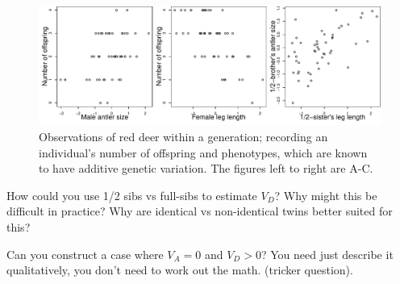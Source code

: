 \begin{figure}
\begin{center}
\includegraphics[width=\textwidth]{figures/Red_deer_selection.pdf}
\end{center}
\caption{ Observations of red deer within a generation; recording an
individual’s number of offspring and phenotypes, which are known to
have additive genetic variation. The figures left to right are A-C.} \label{fig:red_deer_Q}
\end{figure}



\begin{question}
How could you use 1/2 sibs vs full-sibs to estimate $V_D$? Why might
this be difficult in practice? Why are identical vs non-identical
twins better suited for this?
\end{question}

\begin{question}
Can you construct a case where $V_A=0$ and $V_D>0$? You need
just describe it qualitatively, you don't need to work out the
math. (tricker question).
\end{question}



\newpage

